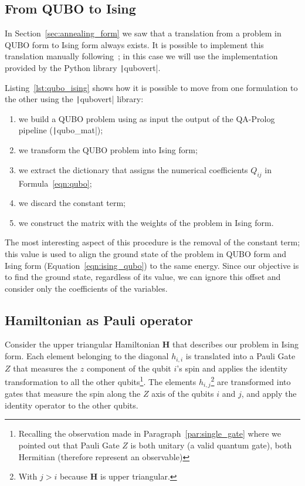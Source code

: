\subsection{From QUBO to Ising}
In Section~\ref{sec:annealing_form} we saw that a translation from a problem in QUBO form to Ising form always exists. It is possible to implement this translation manually following~\cite{bian2010ising}; in this case we will use the implementation provided by the Python library \texttt|qubovert|.

\begin{listingenv}[h]
	\caption{From QUBO form to Ising}
	\label{lst:qubo_ising}
\end{listingenv}

Listing~\ref{lst:qubo_ising} shows how it is possible to move from one formulation to the other using the \texttt|qubovert| library:
\begin{enumerate}
	\item we build a QUBO problem using as input the output of the QA-Prolog pipeline (\texttt|qubo_mat|);
	\item we transform the QUBO problem into Ising form;
	\item we extract the dictionary that assigns the numerical coefficients $Q_{ij}$ in Formula~\ref{eqn:qubo};
	\item we discard the constant term;
	\item we construct the matrix with the weights of the problem in Ising form.
\end{enumerate}
The most interesting aspect of this procedure is the removal of the constant term; this value is used to align the ground state of the problem in QUBO form and Ising form (Equation~\ref{eqn:ising_qubo}) to the same energy. Since our objective is to find the ground state, regardless of its value, we can ignore this offset and consider only the coefficients of the variables.

\subsection{Hamiltonian as Pauli operator}
Consider the upper triangular Hamiltonian $\mathbf{H}$ that describes our problem in Ising form. Each element belonging to the diagonal $h_{i,i}$ is translated into a Pauli Gate $Z$ that measures the $z$ component of the  qubit $i$'s spin and applies the identity transformation to all the other qubits\footnote{Recalling the observation made in Paragraph~\ref{par:single_gate} where we pointed out that Pauli Gate $Z$ is both unitary (a valid quantum gate), both Hermitian (therefore represent an observable)}. The elements $h_{i,j}$\footnote{With $j>i$ because $\mathbf{H}$ is upper triangular.} are transformed into gates that measure the spin along the $Z$ axis of the qubits $i$ and $j$, and apply the identity operator to the other qubits. 

